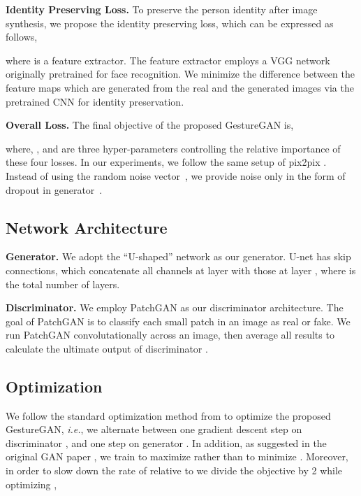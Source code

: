 \documentclass[sigconf]{acmart}
\begin{document}
\noindent \textbf{Identity Preserving Loss.} To preserve the person identity after image synthesis, we propose the identity preserving loss, which can be expressed as follows,

where  is a feature extractor. 
The feature extractor employs a VGG network \cite{simonyan2014very} originally pretrained for face recognition.
We minimize the difference between the feature maps which are generated from the real and the generated images via the pretrained CNN for identity preservation. 

\noindent \textbf{Overall Loss.} The final objective of the proposed GestureGAN is,

where,  ,  and  are three hyper-parameters controlling the relative importance of these four losses.
In our experiments, we follow the same setup of pix2pix \cite{isola2017image}.
Instead of using the random noise vector~, we provide noise only in the form of dropout in generator~.


\subsection{Network Architecture}

\noindent\textbf{Generator.}
We adopt the ``U-shaped'' network \cite{isola2017image} as our generator.
U-net has skip connections, which concatenate all channels at layer  with those at layer , where  is the total number of layers.

\noindent\textbf{Discriminator.}
We employ PatchGAN  \cite{isola2017image}  as our discriminator architecture.
The goal of PatchGAN  is to classify each small patch in an image as real or fake.
We run PatchGAN convolutationally across an image, then average all results to calculate the ultimate output of discriminator .

\subsection{Optimization}

We follow the standard optimization method from \cite{goodfellow2014generative} to optimize the proposed GestureGAN, \textit{i.e.}, we alternate between one gradient descent step on discriminator , and one step on generator .
In addition, as suggested in the original GAN paper \cite{goodfellow2014generative}, we train to maximize  rather than to minimize .
Moreover, in order to slow down the rate of  relative to  we divide the objective by 2 while optimizing ,
\vspace{-0.1cm}
\end{document}
